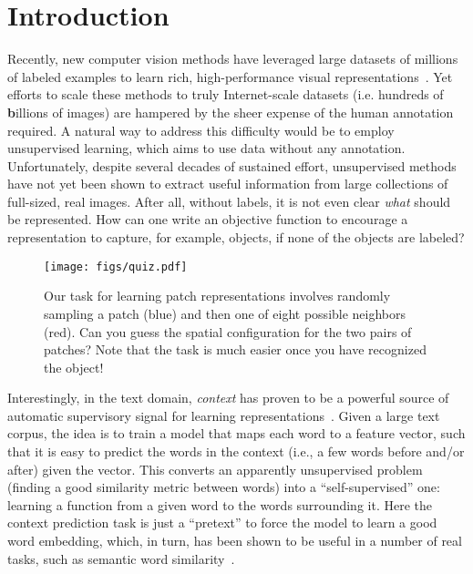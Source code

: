 \documentclass[10pt,twocolumn,letterpaper]{article}
\begin{document}
\section{Introduction}
\vspace{-0.05in}
Recently, 
new computer vision methods have leveraged large datasets of millions of labeled examples to learn rich, high-performance visual representations~\cite{krizhevsky2012imagenet}. 
Yet efforts to scale these methods to truly Internet-scale datasets (i.e. hundreds of {\bf b}illions of images) are hampered by the sheer expense of the human annotation required. 
A natural way to address this difficulty would be to employ unsupervised learning, which aims to use data without any annotation.  Unfortunately, despite several decades of sustained effort, unsupervised methods
have not yet been shown to extract useful information from
large collections of full-sized, real images.  
After all, without labels, it is not even clear \textit{what} should be represented. How can one write an objective function to encourage a representation to capture, for example, objects, if none of the objects are labeled?   


\begin{figure}[t]
\begin{center}

   \texttt{[image: figs/quiz.pdf]}
   \vspace{-.2cm}
\end{center}
   \caption{Our task for learning patch representations involves randomly sampling a patch (blue) and then one of eight possible neighbors (red).  Can you guess the spatial configuration for the two pairs of patches?  Note that the task is much easier once you have recognized the object! 
}
\hfill\protect{}
\vspace{-.2in}
\label{fig:quiz}
\end{figure}



Interestingly, in the text domain, \textit{context} has proven to be a powerful source of automatic supervisory signal for learning representations~\cite{ando2005framework,tsujiiythu2007discriminative,collobert2008unified,mikolov2013distributed}. 
Given a large text corpus, the idea is to train a model that maps each word to a feature vector, such that it is easy to predict the words in the context (i.e., a few words before and/or after) given the vector.  This converts an apparently unsupervised problem (finding a good similarity metric between words) into a 
``self-supervised'' one: learning a function from a given word to the words surrounding it. Here the context prediction task is just a ``pretext'' to force the model to learn a good word embedding, which, in turn, has been shown to be useful in a number of real tasks, such as semantic word similarity~\cite{mikolov2013distributed}. 
\end{document}
